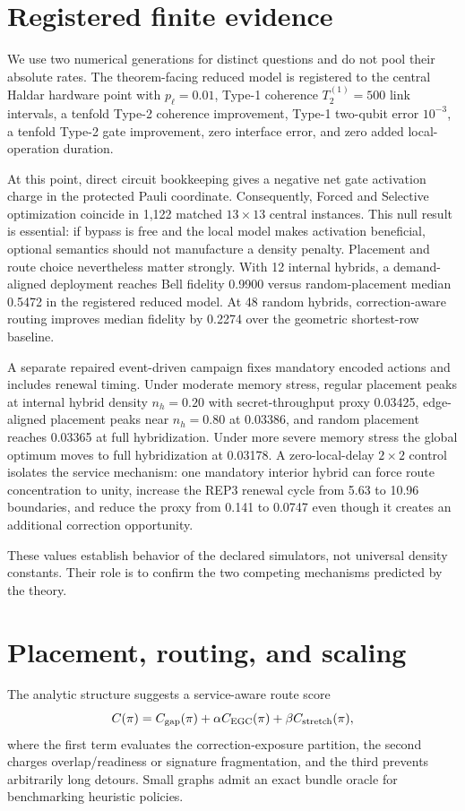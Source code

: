 \documentclass[aps,prx,reprint,superscriptaddress,nofootinbib,longbibliography,floatfix]{revtex4-2}
\begin{document}
\section{Registered finite evidence}
We use two numerical generations for distinct questions and do not pool their absolute rates. The theorem-facing reduced model is registered to the central Haldar hardware point with $p_\ell=0.01$, Type-1 coherence $T_2^{(1)}=500$ link intervals, a tenfold Type-2 coherence improvement, Type-1 two-qubit error $10^{-3}$, a tenfold Type-2 gate improvement, zero interface error, and zero added local-operation duration.

At this point, direct circuit bookkeeping gives a negative net gate activation charge in the protected Pauli coordinate. Consequently, Forced and Selective optimization coincide in 1,122 matched $13\times13$ central instances. This null result is essential: if bypass is free and the local model makes activation beneficial, optional semantics should not manufacture a density penalty. Placement and route choice nevertheless matter strongly. With 12 internal hybrids, a demand-aligned deployment reaches Bell fidelity 0.9900 versus random-placement median 0.5472 in the registered reduced model. At 48 random hybrids, correction-aware routing improves median fidelity by 0.2274 over the geometric shortest-row baseline.

A separate repaired event-driven campaign fixes mandatory encoded actions and includes renewal timing. Under moderate memory stress, regular placement peaks at internal hybrid density $n_h=0.20$ with secret-throughput proxy 0.03425, edge-aligned placement peaks near $n_h=0.80$ at 0.03386, and random placement reaches 0.03365 at full hybridization. Under more severe memory stress the global optimum moves to full hybridization at 0.03178. A zero-local-delay $2\times2$ control isolates the service mechanism: one mandatory interior hybrid can force route concentration to unity, increase the REP3 renewal cycle from 5.63 to 10.96 boundaries, and reduce the proxy from 0.141 to 0.0747 even though it creates an additional correction opportunity.

These values establish behavior of the declared simulators, not universal density constants. Their role is to confirm the two competing mechanisms predicted by the theory.

\section{Placement, routing, and scaling}
The analytic structure suggests a service-aware route score
\begin{equation}
C(\pi)=C_{\rm gap}(\pi)+\alpha C_{\rm EGC}(\pi)+\beta C_{\rm stretch}(\pi),
\end{equation}
where the first term evaluates the correction-exposure partition, the second charges overlap/readiness or signature fragmentation, and the third prevents arbitrarily long detours. Small graphs admit an exact bundle oracle for benchmarking heuristic policies.
\end{document}
